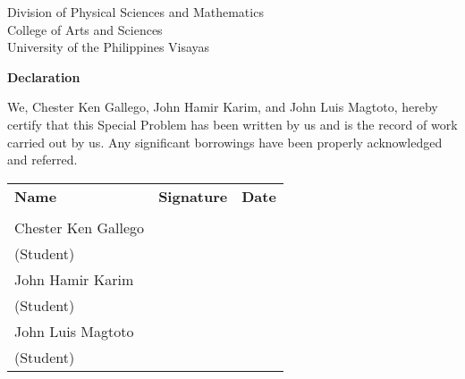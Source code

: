 \begin{center}
	Division of Physical Sciences and Mathematics\\
	College of Arts and Sciences\\
	University of the Philippines Visayas 
	
		\textbf{Declaration}
		\end{center}

We,  Chester Ken Gallego, John Hamir Karim, and John Luis Magtoto, hereby certify that this Special Problem has been written by us  and is the record of work carried out by us. Any significant borrowings have been properly acknowledged and referred.

	\begin{tabular}{lll}
	\bfseries Name  & \bfseries Signature & \bfseries Date\\ \\
	Chester Ken Gallego &\signaturerule  & \signaturerule\\ 
	\multicolumn{1}{l}{(Student)} \\ 
	John Hamir Karim &\signaturerule  & \signaturerule\\ 
	\multicolumn{1}{l}{(Student)} \\
	John Luis Magtoto &\signaturerule  & \signaturerule\\ 
\multicolumn{1}{l}{(Student)} \\

\end{tabular}



